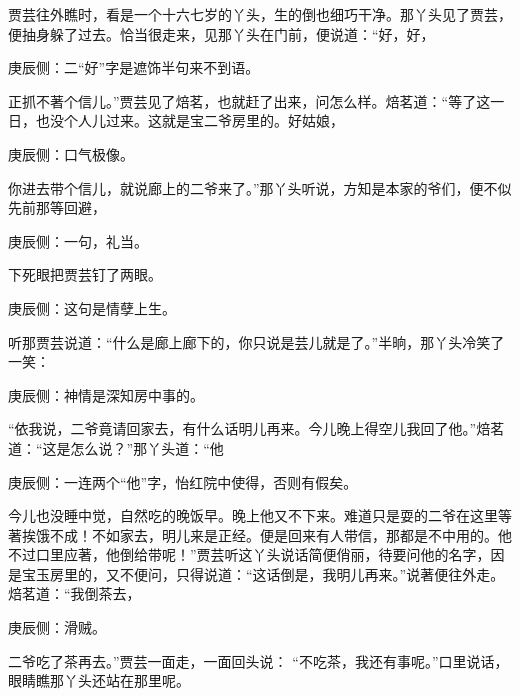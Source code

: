 \begin{parag}
    贾芸往外瞧时，看是一个十六七岁的丫头，生的倒也细巧干净。那丫头见了贾芸，便抽身躲了过去。恰当很走来，见那丫头在门前，便说道：“好，好，\begin{note}庚辰侧：二“好”字是遮饰半句来不到语。\end{note}正抓不著个信儿。”贾芸见了焙茗，也就赶了出来，问怎么样。焙茗道：“等了这一日，也没个人儿过来。这就是宝二爷房里的。好姑娘，\begin{note}庚辰侧：口气极像。\end{note}你进去带个信儿，就说廊上的二爷来了。”那丫头听说，方知是本家的爷们，便不似先前那等回避，\begin{note}庚辰侧：一句，礼当。\end{note}下死眼把贾芸钉了两眼。\begin{note}庚辰侧：这句是情孽上生。\end{note}听那贾芸说道：“什么是廊上廊下的，你只说是芸儿就是了。”半晌，那丫头冷笑了一笑：\begin{note}庚辰侧：神情是深知房中事的。\end{note}“依我说，二爷竟请回家去，有什么话明儿再来。今儿晚上得空儿我回了他。”焙茗道：“这是怎么说？”那丫头道：“他\begin{note}庚辰侧：一连两个“他”字，怡红院中使得，否则有假矣。\end{note}今儿也没睡中觉，自然吃的晚饭早。晚上他又不下来。难道只是耍的二爷在这里等著挨饿不成！不如家去，明儿来是正经。便是回来有人带信，那都是不中用的。他不过口里应著，他倒给带呢！”贾芸听这丫头说话简便俏丽，待要问他的名字，因是宝玉房里的，又不便问，只得说道：“这话倒是，我明儿再来。”说著便往外走。焙茗道：“我倒茶去，\begin{note}庚辰侧：滑贼。\end{note}二爷吃了茶再去。”贾芸一面走，一面回头说： “不吃茶，我还有事呢。”口里说话，眼睛瞧那丫头还站在那里呢。
\end{parag}


